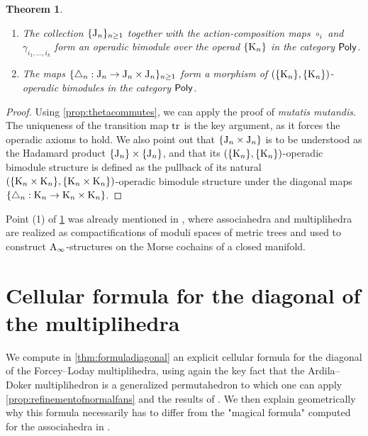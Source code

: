 \documentclass[10pt]{amsart}
\newtheorem{theorem}{Theorem}
\theoremstyle{remark}
\begin{document}
\begin{samepage}
\begin{theorem}\label{thm:MainOperad}\leavevmode
\begin{enumerate}[leftmargin=*]
\item The collection $\{\mathrm{J}_n\}_{n\geq 1}$ together with the action-composition maps $\circ_i$ and $\gamma_{i_1,\ldots,i_k}$ form an operadic bimodule over the operad $\{\mathrm{K}_n\}$ in the category $\mathsf{Poly}$. 

\item The maps $\{\triangle_n : \mathrm{J}_n \to \mathrm{J}_n\times \mathrm{J}_n\}_{n\geq 1}$ form a morphism of $(\{\mathrm{K}_n\},\{\mathrm{K}_n\})$-operadic bimodules in the category $\mathsf{Poly}$. 
\end{enumerate}
\end{theorem}
\end{samepage}

\begin{proof}
Using \cref{prop:thetacommutes}, we can apply the proof of \cite[Theorem~1]{MTTV19} \emph{mutatis mutandis}. The uniqueness of the transition map $\mathrm{tr}$ is the key argument, as it forces the operadic axioms to hold. We also point out that $\{ \mathrm{J}_n\times \mathrm{J}_n \}$ is to be understood as the Hadamard product $\{ \mathrm{J}_n \} \times \{ \mathrm{J}_n \}$, and that its $(\{\mathrm{K}_n\},\{\mathrm{K}_n\})$-operadic bimodule structure is defined as the pullback of its natural $(\{\mathrm{K}_n \times \mathrm{K}_n\},\{\mathrm{K}_n \times \mathrm{K}_n\})$-operadic bimodule structure under the diagonal maps $\{ \triangle_n : \mathrm{K}_n \to \mathrm{K}_n \times \mathrm{K}_n \}$.
\end{proof}

Point (1) of \cref{thm:MainOperad} was already mentioned in \cite[Section 1.2]{mazuir-I}, where associahedra and multiplihedra are realized as compactifications of moduli spaces of metric trees and used to construct $\mathrm{A}_\infty$-structures on the Morse cochains of a closed manifold.


\section{Cellular formula for the diagonal of the multiplihedra} \label{sec:III}

We compute in \cref{thm:formuladiagonal} an explicit cellular formula for the diagonal of the Forcey--Loday multiplihedra, using again the key fact that the Ardila--Doker multiplihedron is a generalized permutahedron to which one can apply \cref{prop:refinementofnormalfans} and the results of \cite{LA21}. We then explain geometrically why this formula necessarily has to differ from the "magical formula" computed for the associahedra in \cite{MTTV19}.
\end{document}
